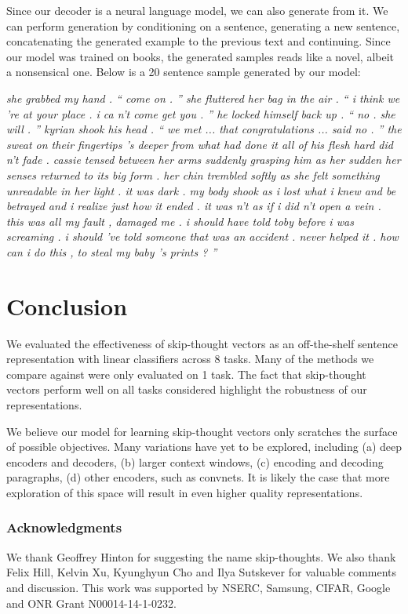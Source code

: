 \documentclass{article} \usepackage{nips15submit_e,times}
\begin{document}
Since our decoder is a neural language model, we can also generate from it. We can perform generation by conditioning on a sentence, generating a new sentence, concatenating the generated example to the previous text and continuing. Since our model was trained on books, the generated samples reads like a novel, albeit a nonsensical one. Below is a 20 sentence sample generated by our model:

\small{ {\it
she grabbed my hand .
`` come on . ''
she fluttered her bag in the air .
`` i think we 're at your place .
i ca n't come get you . ''
he locked himself back up .
`` no .
she will . ''
kyrian shook his head .
`` we met ... that congratulations ... said no . ''
the sweat on their fingertips 's deeper from what had done it all of his flesh hard did n't fade .
cassie tensed between her arms suddenly grasping him as her sudden her senses returned to its big form .
her chin trembled softly as she felt something unreadable in her light .
it was dark .
my body shook as i lost what i knew and be betrayed and i realize just how it ended .
it was n't as if i did n't open a vein .
this was all my fault , damaged me .
i should have told toby before i was screaming .
i should 've told someone that was an accident .
never helped it .
how can i do this , to steal my baby 's prints ? ''
}}
\normalsize


\section{Conclusion}

We evaluated the effectiveness of skip-thought vectors as an off-the-shelf sentence representation with linear classifiers across 8 tasks. Many of the methods we compare against were only evaluated on 1 task. The fact that skip-thought vectors perform well on all tasks considered highlight the robustness of our representations.

We believe our model for learning skip-thought vectors only scratches the surface of possible objectives. Many variations have yet to be explored, including (a) deep encoders and decoders, (b) larger context windows, (c) encoding and decoding paragraphs, (d) other encoders, such as convnets. It is likely the case that more exploration of this space will result in even higher quality representations.

\subsubsection*{Acknowledgments}

We thank Geoffrey Hinton for suggesting the name skip-thoughts. We also thank Felix Hill, Kelvin Xu, Kyunghyun Cho and Ilya Sutskever for valuable comments and discussion. This work was supported by NSERC, Samsung, CIFAR, Google and ONR Grant N00014-14-1-0232.


\small{}
\small{}
\end{document}
